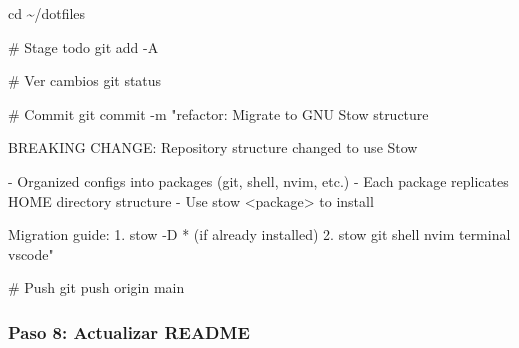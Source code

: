 \documentclass[
  doc,
  floatsintext,
  longtable,
  a4paper,
  nolmodern,
  notxfonts,
  notimes,
  12pt,
  colorlinks=true,linkcolor=blue,citecolor=blue,urlcolor=blue]{apa7}
\newenvironment{Shaded}{\begin{snugshade}}{\end{snugshade}}
\newcommand{\AttributeTok}[1]{\textcolor[rgb]{0.40,0.45,0.13}{#1}}
\newcommand{\BuiltInTok}[1]{\textcolor[rgb]{0.00,0.23,0.31}{#1}}
\newcommand{\CommentTok}[1]{\textcolor[rgb]{0.37,0.37,0.37}{#1}}
\newcommand{\FunctionTok}[1]{\textcolor[rgb]{0.28,0.35,0.67}{#1}}
\newcommand{\NormalTok}[1]{\textcolor[rgb]{0.00,0.23,0.31}{#1}}
\newcommand{\StringTok}[1]{\textcolor[rgb]{0.13,0.47,0.30}{#1}}
\begin{document}
\begin{Shaded}
\begin{Highlighting}[]
\BuiltInTok{cd}\NormalTok{ \textasciitilde{}/dotfiles}

\CommentTok{\# Stage todo}
\FunctionTok{git}\NormalTok{ add }\AttributeTok{{-}A}

\CommentTok{\# Ver cambios}
\FunctionTok{git}\NormalTok{ status}

\CommentTok{\# Commit}
\FunctionTok{git}\NormalTok{ commit }\AttributeTok{{-}m} \StringTok{"refactor: Migrate to GNU Stow structure}

\StringTok{BREAKING CHANGE: Repository structure changed to use Stow}

\StringTok{{-} Organized configs into packages (git, shell, nvim, etc.)}
\StringTok{{-} Each package replicates HOME directory structure}
\StringTok{{-} Use \textquotesingle{}stow \textless{}package\textgreater{}\textquotesingle{} to install}

\StringTok{Migration guide:}
\StringTok{1. stow {-}D * (if already installed)}
\StringTok{2. stow git shell nvim terminal vscode"}

\CommentTok{\# Push}
\FunctionTok{git}\NormalTok{ push origin main}
\end{Highlighting}
\end{Shaded}

\subsubsection{Paso 8: Actualizar
README}\label{paso-8-actualizar-readme}
\end{document}
